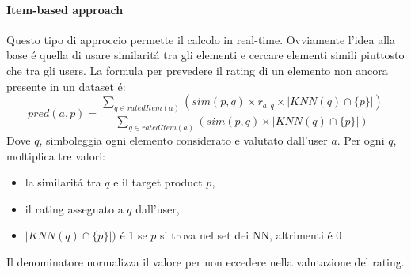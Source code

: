 \paragraph{Item-based approach} Questo tipo di approccio permette il calcolo in real-time. Ovviamente l'idea alla base é quella di usare similaritá tra gli elementi e cercare elementi simili piuttosto che tra gli users. La formula per prevedere il rating di un elemento non ancora presente in un dataset é: 
\[
    pred(a,p) = \frac{\sum_{q\in ratedItem(a)} (sim(p,q) \times r_{a, q} \times |KNN(q) \cap \{ p \}|)}{\sum_{q\in ratedItem(a)} (sim(p,q) \times |KNN(q) \cap \{ p \}|)}
\]
Dove $q$, simboleggia ogni elemento considerato e valutato dall'user $a$. Per ogni $q$, moltiplica tre valori: 
\begin{itemize}
    \item la similaritá tra $q$ e il target product $p$,
    \item il rating assegnato a $q$ dall'user,
    \item $|KNN(q) \cap \{ p \}|)$ é 1 se $p$ si trova nel set dei NN, altrimenti é 0
\end{itemize}
Il denominatore normalizza il valore per non eccedere nella valutazione del rating. 

